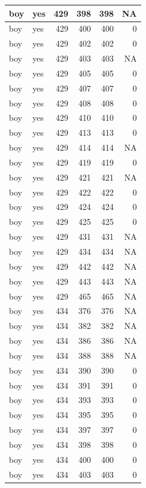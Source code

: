 \documentclass[man]{apa6}
\begin{document}
\begin{tabular}{l|l|r|r|r|r}
\hline
boy & yes & 429 & 398 & 398 & NA\\
\hline
boy & yes & 429 & 400 & 400 & 0\\
\hline
boy & yes & 429 & 402 & 402 & 0\\
\hline
boy & yes & 429 & 403 & 403 & NA\\
\hline
boy & yes & 429 & 405 & 405 & 0\\
\hline
boy & yes & 429 & 407 & 407 & 0\\
\hline
boy & yes & 429 & 408 & 408 & 0\\
\hline
boy & yes & 429 & 410 & 410 & 0\\
\hline
boy & yes & 429 & 413 & 413 & 0\\
\hline
boy & yes & 429 & 414 & 414 & NA\\
\hline
boy & yes & 429 & 419 & 419 & 0\\
\hline
boy & yes & 429 & 421 & 421 & NA\\
\hline
boy & yes & 429 & 422 & 422 & 0\\
\hline
boy & yes & 429 & 424 & 424 & 0\\
\hline
boy & yes & 429 & 425 & 425 & 0\\
\hline
boy & yes & 429 & 431 & 431 & NA\\
\hline
boy & yes & 429 & 434 & 434 & NA\\
\hline
boy & yes & 429 & 442 & 442 & NA\\
\hline
boy & yes & 429 & 443 & 443 & NA\\
\hline
boy & yes & 429 & 465 & 465 & NA\\
\hline
boy & yes & 434 & 376 & 376 & NA\\
\hline
boy & yes & 434 & 382 & 382 & NA\\
\hline
boy & yes & 434 & 386 & 386 & NA\\
\hline
boy & yes & 434 & 388 & 388 & NA\\
\hline
boy & yes & 434 & 390 & 390 & 0\\
\hline
boy & yes & 434 & 391 & 391 & 0\\
\hline
boy & yes & 434 & 393 & 393 & 0\\
\hline
boy & yes & 434 & 395 & 395 & 0\\
\hline
boy & yes & 434 & 397 & 397 & 0\\
\hline
boy & yes & 434 & 398 & 398 & 0\\
\hline
boy & yes & 434 & 400 & 400 & 0\\
\hline
boy & yes & 434 & 403 & 403 & 0\\

\end{tabular}
\end{document}
